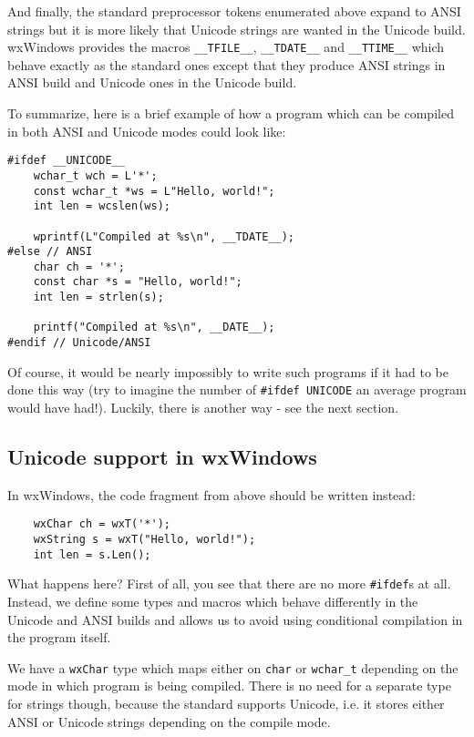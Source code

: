And finally, the standard preprocessor tokens enumerated above expand to ANSI
strings but it is more likely that Unicode strings are wanted in the Unicode
build. wxWindows provides the macros {\tt \_\_TFILE\_\_}, {\tt \_\_TDATE\_\_} 
and {\tt \_\_TTIME\_\_} which behave exactly as the standard ones except that
they produce ANSI strings in ANSI build and Unicode ones in the Unicode build.

To summarize, here is a brief example of how a program which can be compiled
in both ANSI and Unicode modes could look like:

\begin{verbatim}
#ifdef __UNICODE__
    wchar_t wch = L'*';
    const wchar_t *ws = L"Hello, world!";
    int len = wcslen(ws);

    wprintf(L"Compiled at %s\n", __TDATE__);
#else // ANSI
    char ch = '*';
    const char *s = "Hello, world!";
    int len = strlen(s);

    printf("Compiled at %s\n", __DATE__);
#endif // Unicode/ANSI
\end{verbatim}

Of course, it would be nearly impossibly to write such programs if it had to
be done this way (try to imagine the number of {\tt \#ifdef UNICODE} an average
program would have had!). Luckily, there is another way - see the next
section.

\subsection{Unicode support in wxWindows}

In wxWindows, the code fragment from above should be written instead:

\begin{verbatim}
    wxChar ch = wxT('*');
    wxString s = wxT("Hello, world!");
    int len = s.Len();
\end{verbatim}

What happens here? First of all, you see that there are no more {\tt \#ifdef}s
at all. Instead, we define some types and macros which behave differently in
the Unicode and ANSI builds and allows us to avoid using conditional
compilation in the program itself.

We have a {\tt wxChar} type which maps either on {\tt char} or {\tt wchar\_t} 
depending on the mode in which program is being compiled. There is no need for
a separate type for strings though, because the standard 
 supports Unicode, i.e. it stores either ANSI or
Unicode strings depending on the compile mode.

